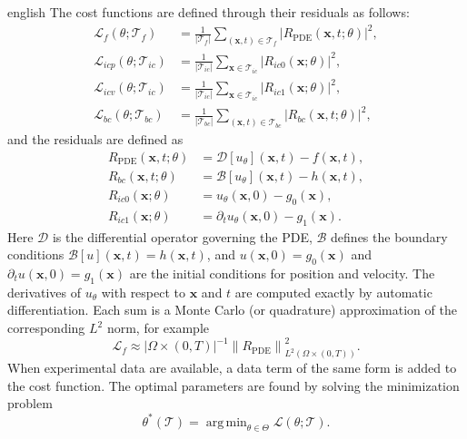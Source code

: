 \documentclass[11pt,letterpaper,twoside,openright]{book} %
\newcommand{\norm}[1]{\left\lVert #1 \right\rVert}
\newcommand{\abs}[1]{\left\lvert #1 \right\rvert}
\newcommand{\Loss}{\mathcal{L}}
\newcommand{\T}{\mathcal{T}}
\DeclareMathOperator*{\argmin}{arg\,min}
\begin{document}
\begin{hyphenrules}{english}
The cost functions are defined through their residuals as follows:
\begin{align}
  \Loss_f(\theta;\T_f)&=\frac{1}{\abs{\T_f}}\sum_{(\mathbf{x},t)\in\T_f}\abs{R_{\mathrm{PDE}}(\mathbf{x},t;\theta)}^2,\label{eq:loss-f}\\
  \Loss_{icp}(\theta;\T_{ic})&=\frac{1}{\abs{\T_{ic}}}\sum_{\mathbf{x}\in\T_{ic}}\abs{R_{ic0}(\mathbf{x};\theta)}^2,\label{eq:loss-icp}\\
  \Loss_{icv}(\theta;\T_{ic})&=\frac{1}{\abs{\T_{ic}}}\sum_{\mathbf{x}\in\T_{ic}}\abs{R_{ic1}(\mathbf{x};\theta)}^2,\label{eq:loss-icv}\\
  \Loss_{bc}(\theta;\T_{bc})&=\frac{1}{\abs{\T_{bc}}}\sum_{(\mathbf{x},t)\in\T_{bc}}\abs{R_{bc}(\mathbf{x},t;\theta)}^2,\label{eq:loss-bc}
\end{align}
and the residuals are defined as
\begin{align}
  R_{\mathrm{PDE}}(\mathbf{x},t;\theta)&=\mathcal{D}[u_\theta](\mathbf{x},t)-f(\mathbf{x},t), \label{eq:res-pde}\\
  R_{bc}(\mathbf{x},t;\theta)&=\mathcal{B}[u_\theta](\mathbf{x},t)-h(\mathbf{x},t), \label{eq:res-bc}\\
  R_{ic0}(\mathbf{x};\theta)&=u_\theta(\mathbf{x},0)-g_0(\mathbf{x}), \label{eq:res-ic0}\\
  R_{ic1}(\mathbf{x};\theta)&=\partial_t u_\theta(\mathbf{x},0)-g_1(\mathbf{x}). \label{eq:res-ic1}
\end{align}
Here $\mathcal{D}$ is the differential operator governing the PDE, $\mathcal{B}$ defines the boundary
conditions $\mathcal{B}[u](\mathbf{x},t)=h(\mathbf{x},t)$, and $u(\mathbf{x},0)=g_0(\mathbf{x})$ and $\partial_t u(\mathbf{x},0)=g_1(\mathbf{x})$ are the
initial conditions for position and velocity. The derivatives of $u_\theta$ with respect to $\mathbf{x}$ and $t$
are computed exactly by automatic differentiation. Each sum is a Monte Carlo (or quadrature)
approximation of the corresponding $L^2$ norm, for example
\[
  \Loss_f\approx\abs{\Omega\times(0,T)}^{-1}\norm{R_{\mathrm{PDE}}}_{L^2(\Omega\times(0,T))}^2.
\]
When
experimental data are available, a data term of the same form is added to the cost function. The optimal
parameters are found by solving the minimization problem
\begin{equation}
  \theta^{*}(\T)=\argmin_{\theta\in\Theta}\Loss(\theta;\T).
  \label{eq:pinn-argmin}
\end{equation}


\end{hyphenrules}
\end{document}

